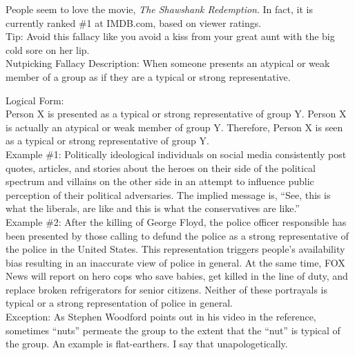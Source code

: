 \documentclass[a4paper,12pt,single,pdftex]{scrartcl}
\begin{document}
    
      People seem to love the movie, {\it The Shawshank Redemption}.  In fact, it is currently ranked \#1 at IMDB.com, based on viewer ratings.
    \\

    
      Tip: Avoid this fallacy like you avoid a kiss from your great aunt with the big cold sore on her lip.
    \\

  

Nutpicking Fallacy
    Description: When someone presents an atypical or weak member of a group as if they are a typical or strong representative.

    
      Logical Form:
    \\

    
      Person X is presented as a typical or strong representative of group Y. \newline
Person X is actually an atypical or weak member of group Y. \newline
Therefore, Person X is seen as a typical or strong representative of group Y.
    \\

    
      Example \#1: Politically ideological individuals on social media consistently post quotes, articles, and stories about the heroes on their side of the political spectrum and villains on the other side in an attempt to influence public perception of their political adversaries. The implied message is, “See, this is what the liberals, are like and this is what the conservatives are like.”
    \\

    
      Example \#2: After the killing of George Floyd, the police officer responsible has been presented by those calling to defund the police as a strong representative of the police in the United States. This representation triggers people’s availability bias resulting in an inaccurate view of police in general. At the same time, FOX News will report on hero cops who save babies, get killed in the line of duty, and replace broken refrigerators for senior citizens. Neither of these portrayals is typical or a strong representation of police in general.
    \\

    
      Exception: As Stephen Woodford points out in his video in the reference, sometimes “nuts” permeate the group to the extent that the “nut” is typical of the group. An example is flat-earthers. I say that unapologetically.
    \\
\end{document}
